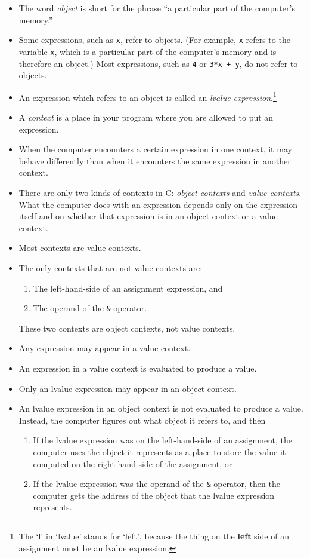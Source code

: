 \begin{itemize}
\item The word {\em object}\/ is short for the phrase ``a particular
part of the computer's memory.''
\item Some expressions, such as {\tt x},  refer to objects.  (For
example, {\tt x} refers to the variable {\tt x}, which is a particular
part of the computer's memory and is therefore an object.)  Most
expressions, such as {\tt 4} or {\tt 3*x + y}, do not refer to objects.
\item An expression which refers to  an object is
called an {\em lvalue expression}\/.\footnote{The `l' in `lvalue' stands
for `left', because the thing on the {\bf left} side of an assignment
must be an lvalue expression.}
\item A {\em context}\/ is a place in your program where you are allowed
to put an expression.
\item When the computer encounters a certain expression in one context,
it may behave differently than when it encounters the same expression in
another context.
\item There are only two kinds of contexts in C: {\em object contexts}\/
and {\em value contexts}\/.  What the computer does with an expression
depends only on the expression itself and on whether that expression is
in an object context or a value context.
\item Most contexts are value contexts.  
\item The only contexts that are not value contexts are:
\begin{enumerate}
\item The left-hand-side of an assignment expression, and
\item The operand of the {\tt\&} operator.
\end{enumerate}
These two contexts are object contexts, not value contexts.
\item Any expression may appear in a value context.
\item An expression in a value context is evaluated to produce a value.
\item Only an lvalue expression may appear in an object context.   
\item An lvalue expression in an object context is not evaluated to
produce a value.  Instead, the computer figures out what object it
refers to, and then
\begin{enumerate}
\item If the lvalue expression was on the left-hand-side of an assignment, the
computer uses the object it represents as a place to store the value it
computed on the right-hand-side of the assignment, or
\item If the lvalue expression was the operand of the {\tt\&} operator, then the
computer gets the address of the object that the lvalue expression represents.
\end{enumerate}
\end{itemize}

